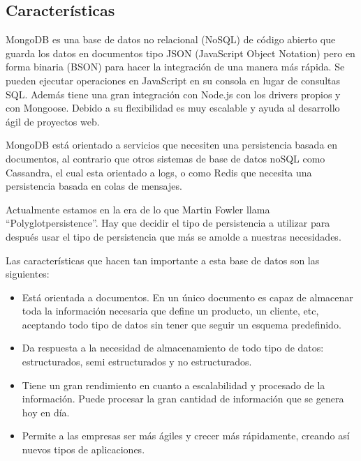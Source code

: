 \subsection{Características}
MongoDB es una base de datos no relacional (NoSQL) de código abierto que guarda los datos en documentos tipo JSON (JavaScript Object Notation) pero en forma binaria (BSON) para hacer la integración de una manera más rápida. Se pueden ejecutar operaciones en JavaScript en su consola en lugar de consultas SQL. Además tiene una gran integración con Node.js con los drivers propios y con Mongoose. Debido a su flexibilidad es muy escalable y ayuda al desarrollo ágil de proyectos web.

MongoDB está orientado a servicios que necesiten una persistencia basada en documentos, al contrario que otros sistemas de base de datos noSQL como Cassandra, el cual esta orientado a logs, o como Redis que necesita una persistencia basada en colas de mensajes.

Actualmente estamos en la era de lo que Martin Fowler llama “Polyglotpersistence”. Hay que decidir el tipo de persistencia a utilizar para después usar el tipo de persistencia que más se amolde a nuestras necesidades.

Las características que hacen tan importante a esta base de datos son las siguientes:



\begin{itemize}

    \item Está orientada a documentos. En un único documento es capaz de almacenar toda la información necesaria que define un producto, un cliente, etc, aceptando todo tipo de datos sin tener que seguir un esquema predefinido.

    \item Da respuesta a la necesidad de almacenamiento de todo tipo de datos: estructurados, semi estructurados y no estructurados.

    \item Tiene un gran rendimiento en cuanto a escalabilidad y procesado de la información. Puede procesar la gran cantidad de información que se genera hoy en día.

    \item Permite a las empresas ser más ágiles y crecer más rápidamente, creando así nuevos tipos de aplicaciones.


\end{itemize}


